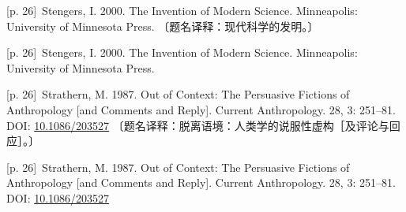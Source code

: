 \documentclass[10pt,a4paper]{article}
\begin{document}
\noindent\begin{minipage}{\textwidth}\begin{minipage}[t]{\dimexpr.5\textwidth-4mm\relax}\noindent\begin{minipage}[t]{\linewidth}{\scriptsize\color{gray} [p. 26]}\ Stengers, I. 2000. The Invention of Modern Science. Minneapolis: University of Minnesota Press. 〔题名译释：现代科学的发明。〕\par\end{minipage}\par\end{minipage}\hfill\begin{minipage}[t]{\dimexpr.5\textwidth-4mm\relax}\noindent\begin{minipage}[t]{\linewidth}{\scriptsize\color{gray} [p. 26]}\ Stengers, I. 2000. The Invention of Modern Science. Minneapolis: University of Minnesota Press.\par\end{minipage}\par\end{minipage}\end{minipage}\par
\noindent\begin{minipage}{\textwidth}\begin{minipage}[t]{\dimexpr.5\textwidth-4mm\relax}\noindent\begin{minipage}[t]{\linewidth}{\scriptsize\color{gray} [p. 26]}\ Strathern, M. 1987. Out of Context: The Persuasive Fictions of Anthropology [and Comments and Reply]. Current Anthropology. 28, 3: 251–81. DOI: \url{10.1086/203527} 〔题名译释：脱离语境：人类学的说服性虚构［及评论与回应］。〕\par\end{minipage}\par\end{minipage}\hfill\begin{minipage}[t]{\dimexpr.5\textwidth-4mm\relax}\noindent\begin{minipage}[t]{\linewidth}{\scriptsize\color{gray} [p. 26]}\ Strathern, M. 1987. Out of Context: The Persuasive Fictions of Anthropology [and Comments and Reply]. Current Anthropology. 28, 3: 251–81. DOI: \url{10.1086/203527}\par\end{minipage}\par\end{minipage}\end{minipage}\par
\end{document}
